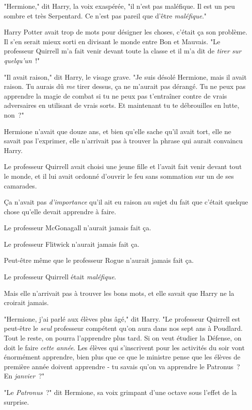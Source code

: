 "Hermione," dit Harry, la voix exaspérée, "il n'est pas maléfique. Il est un peu sombre et très Serpentard. Ce n'est pas pareil que d'être \emph{maléfique}."

Harry Potter avait trop de mots pour désigner les choses, c'était ça son problème. Il s'en serait mieux sorti en divisant le monde entre Bon et Mauvais. "Le professeur Quirrell m'a fait venir devant toute la classe et il m'a dit de \emph{tirer sur quelqu'un}~!"

"Il avait raison," dit Harry, le visage grave. "Je suis désolé Hermione, mais il avait raison. Tu aurais dû \emph{me} tirer dessus, ça ne m'aurait pas dérangé. Tu ne peux pas apprendre la magie de combat si tu ne peux pas t'entraîner contre de vrais adversaires en utilisant de vrais sorts. Et maintenant tu te débrouilles en lutte, non~?"

Hermione n'avait que douze ans, et bien qu'elle sache qu'il avait tort, elle ne savait pas l'exprimer, elle n'arrivait pas à trouver la phrase qui aurait convaincu Harry.

Le professeur Quirrell avait choisi une jeune fille et l'avait fait venir devant tout le monde, et il lui avait ordonné d'ouvrir le feu sans sommation sur un de ses camarades.

Ça n'avait pas \emph{d'importance} qu'il ait eu raison au sujet du fait que c'était quelque chose qu'elle devait apprendre à faire.

Le professeur McGonagall n'aurait jamais fait ça.

Le professeur Flitwick n'aurait jamais fait ça.

Peut-être même que le professeur Rogue n'aurait jamais fait ça.

Le professeur Quirrell était \emph{maléfique}.

Mais elle n'arrivait pas à trouver les bons mots, et elle savait que Harry ne la croirait jamais.

"Hermione, j'ai parlé aux élèves plus âgé," dit Harry. "Le professeur Quirrell est peut-être le \emph{seul} professeur compétent qu'on aura dans nos sept ans à Poudlard. Tout le reste, on pourra l'apprendre plus tard. Si on veut étudier la Défense, on doit le faire \emph{cette année}. Les élèves qui s'inscrivent pour les activités du soir vont énormément apprendre, bien plus que ce que le ministre pense que les élèves de première année doivent apprendre - tu savais qu'on va apprendre le Patronus~? En \emph{janvier}~?"

"Le \emph{Patronus}~?" dit Hermione, sa voix grimpant d'une octave sous l'effet de la surprise.

